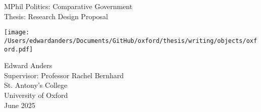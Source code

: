 \begin{titlepage}
\thispagestyle{empty}
\centering
\vspace*{6em}

{\LARGE MPhil Politics: Comparative Government \\[1em]}
{\LARGE Thesis: Research Design Proposal \\[2em]}


\vspace{3em}
\texttt{[image: /Users/edwardanders/Documents/GitHub/oxford/thesis/writing/objects/oxford.pdf]}
\vspace{4em}

{\Large Edward Anders \\[0.5em]}
Supervisor: Professor Rachel Bernhard \\[1em]
St. Antony's College \\
University of Oxford \\[1em]

June 2025

\vfill

\end{titlepage}
\newpage